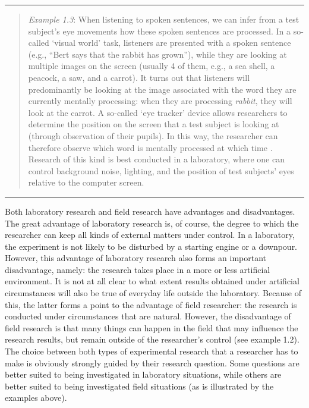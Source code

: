 \documentclass[
]{book}
\begin{document}
\begin{center}\rule{0.5\linewidth}{0.5pt}\end{center}

\begin{quote}
\emph{Example 1.3}: When listening to spoken sentences, we can infer from a test subject's eye movements how these spoken sentences are processed. In a so-called `visual world' task, listeners are presented with a spoken sentence (e.g., ``Bert says that the rabbit has grown''), while they are looking at multiple images on the screen (usually 4 of them, e.g., a sea shell, a peacock, a saw, and a carrot). It turns out that listeners will predominantly be looking at the image associated with the word they are currently mentally processing: when they are processing \emph{rabbit}, they will look at the carrot. A so-called `eye tracker' device allows researchers to determine the position on the screen that a test subject is looking at (through observation of their pupils). In this way, the researcher can therefore observe which word is mentally processed at which time \citep{KMR12}. Research of this kind is best conducted in a laboratory, where one can control background noise, lighting, and the position of test subjects' eyes relative to the computer screen.
\end{quote}

\begin{center}\rule{0.5\linewidth}{0.5pt}\end{center}

Both laboratory research and field research have advantages and disadvantages. The great advantage of laboratory research is, of course, the degree to which the researcher can keep all kinds of external matters under control. In a laboratory, the experiment is not likely to be disturbed by a starting engine or a downpour. However, this advantage of laboratory research also forms an important disadvantage, namely: the research takes place in a more or less artificial environment. It is not at all clear to what extent results obtained under artificial circumstances will also be true of everyday life outside the laboratory. Because of this, the latter forms a point to the advantage of field researcher: the research is conducted under circumstances that are natural. However, the disadvantage of field research is that many things can happen in the field that may influence the research results, but remain outside of the researcher's control (see example 1.2). The choice between both types of experimental research that a researcher has to make is obviously strongly guided by their research question. Some questions are better suited to being investigated in laboratory situations, while others are better suited to being investigated field situations (as is illustrated by the examples above).
\end{document}
